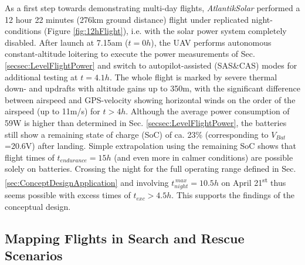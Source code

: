 As a first step towards demonstrating multi-day flights, \textit{AtlantikSolar} performed a 12 hour 22 minutes (276km ground distance) flight under replicated night-conditions (Figure \ref{fig:12hFlight}), i.e. with the solar power system completely disabled. After launch at 7.15am ($t=0h$), the UAV performs autonomous constant-altitude loitering to execute the power measurements of Sec. \ref{secsec:LevelFlightPower} and switch to autopilot-assisted (SAS\&CAS) modes for additional testing at $t=4.1h$. The whole flight is marked by severe thermal down- and updrafts with altitude gains up to 350m, with the significant difference between airspeed and GPS-velocity showing horizontal winds on the order of the airspeed (up to 11m/s) for $t>4h$. Although the average power consumption of 59W is higher than determined in Sec. \ref{secsec:LevelFlightPower}, the batteries still show a remaining state of charge (SoC) of ca. 23\% (corresponding to $V_{Bat}$=20.6V) after landing. Simple extrapolation using the remaining SoC shows that flight times of $t_{endurance}=15h$ (and even more in calmer conditions) are possible solely on batteries. Crossing the night for the full operating range defined in Sec. \ref{sec:ConceptDesignApplication} and involving $t_{night}^{\,max}=10.5h$ on April 21\textsuperscript{st} thus seems possible with excess times of $t_{exc}>4.5h$. This supports the findings of the conceptual design. 

\subsection{Mapping Flights in Search and Rescue Scenarios}


